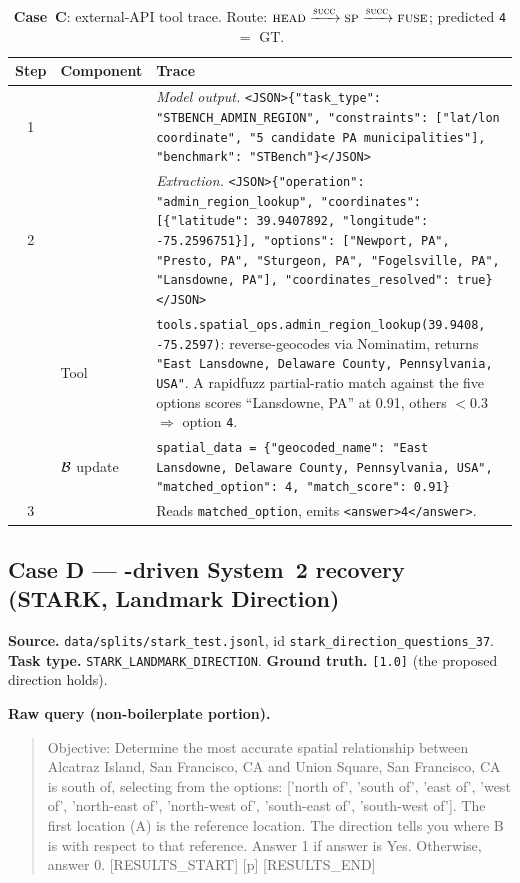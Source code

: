 \begin{table}[H]
\centering
\caption{\textbf{Case~C}: external-API tool trace.  Route: $\textnormal{\textsc{head}} \xrightarrow{\textnormal{\textsc{succ}}} \textnormal{\textsc{sp}} \xrightarrow{\textnormal{\textsc{succ}}} \textnormal{\textsc{fuse}}$; predicted \texttt{4} $=$ GT.}
\label{tab:case_c}
\small
\begin{tabular}{c l p{10.5cm}}
\toprule
Step & Component & Trace \\
\midrule
1 & \shead{} &
\textit{Model output.} \texttt{<JSON>\{"task\_type": "STBENCH\_ADMIN\_REGION", "constraints": ["lat/lon coordinate", "5 candidate PA municipalities"], "benchmark": "STBench"\}</JSON>} \\
\midrule
2 & \ssp{} &
\textit{Extraction.}  \texttt{<JSON>\{"operation": "admin\_region\_lookup", "coordinates": [\{"latitude": 39.9407892, "longitude": -75.2596751\}], "options": ["Newport, PA", "Presto, PA", "Sturgeon, PA", "Fogelsville, PA", "Lansdowne, PA"], "coordinates\_resolved": true\}</JSON>} \\
\midrule
  & Tool &
\texttt{tools.spatial\_ops.admin\_region\_lookup(39.9408, -75.2597)}: reverse-geocodes via Nominatim, returns \texttt{"East Lansdowne, Delaware County, Pennsylvania, USA"}.  A rapidfuzz partial-ratio match against the five options scores ``Lansdowne, PA'' at 0.91, others $< 0.3$ $\Rightarrow$ option \texttt{4}. \\
\midrule
  & $\mathcal{B}$ update &
\texttt{spatial\_data = \{"geocoded\_name": "East Lansdowne, Delaware County, Pennsylvania, USA", "matched\_option": 4, "match\_score": 0.91\}} \\
\midrule
3 & \sfuse{} &
Reads \texttt{matched\_option}, emits \texttt{<answer>4</answer>}. \\
\bottomrule
\end{tabular}
\end{table}
\FloatBarrier
\subsection{Case D --- \smiss{}-driven System~2 recovery (STARK, Landmark Direction)}
\label{app:case_d}

\textbf{Source.} \texttt{data/splits/stark\_test.jsonl}, id \texttt{stark\_direction\_questions\_37}.
\textbf{Task type.} \texttt{STARK\_LANDMARK\_DIRECTION}.
\textbf{Ground truth.} \texttt{[1.0]} (the proposed direction holds).

\textbf{Raw query (non-boilerplate portion).}
\begin{quote}\small\ttfamily
Objective: Determine the most accurate spatial relationship between Alcatraz Island, San Francisco, CA and Union Square, San Francisco, CA is south of, selecting from the options: ['north of', 'south of', 'east of', 'west of', 'north-east of', 'north-west of', 'south-east of', 'south-west of'].  The first location (A) is the reference location.  The direction tells you where B is with respect to that reference.  Answer 1 if answer is Yes. Otherwise, answer 0.
[RESULTS\_START] [p] [RESULTS\_END]
\end{quote}

